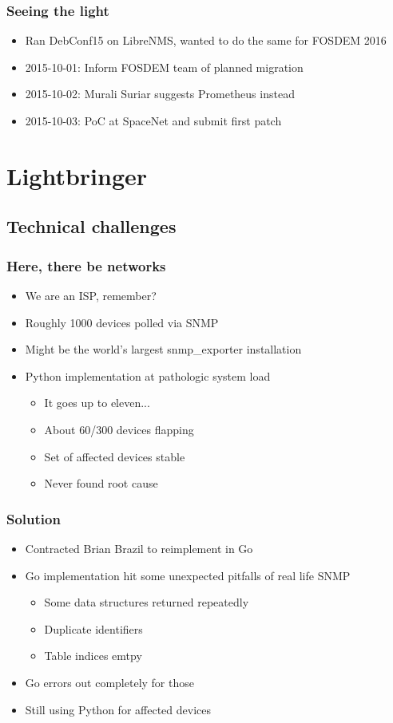 \documentclass[t]{beamer}
\begin{document}
\begin{frame}
	\frametitle{Seeing the light}
	\begin{itemize}
		\item Ran DebConf15 on LibreNMS, wanted to do the same for FOSDEM 2016
		\item 2015-10-01: Inform FOSDEM team of planned migration
		\item 2015-10-02: Murali Suriar suggests Prometheus instead
		\item 2015-10-03: PoC at SpaceNet and submit first patch
	\end{itemize}
\end{frame}




\section{Lightbringer}

\subsection{Technical challenges}

\begin{frame}
	\frametitle{Here, there be networks}
	\begin{itemize}
		\item We are an ISP, remember?
		\item Roughly 1000 devices polled via SNMP
		\item Might be the world's largest snmp\_exporter installation
		\item Python implementation at pathologic system load
		\begin{itemize}
			\item It goes up to eleven...
			\item About 60/300 devices flapping
			\item Set of affected devices stable
			\item Never found root cause
		\end{itemize}
	\end{itemize}
\end{frame}

\begin{frame}
	\frametitle{Solution}
	\begin{itemize}
		\item Contracted Brian Brazil to reimplement in Go
		\item Go implementation hit some unexpected pitfalls of real life SNMP
		\begin{itemize}
			\item Some data structures returned repeatedly
			\item Duplicate identifiers
			\item Table indices emtpy
		\end{itemize}
		\item Go errors out completely for those
		\item Still using Python for affected devices
	\end{itemize}
\end{frame}
\end{document}
